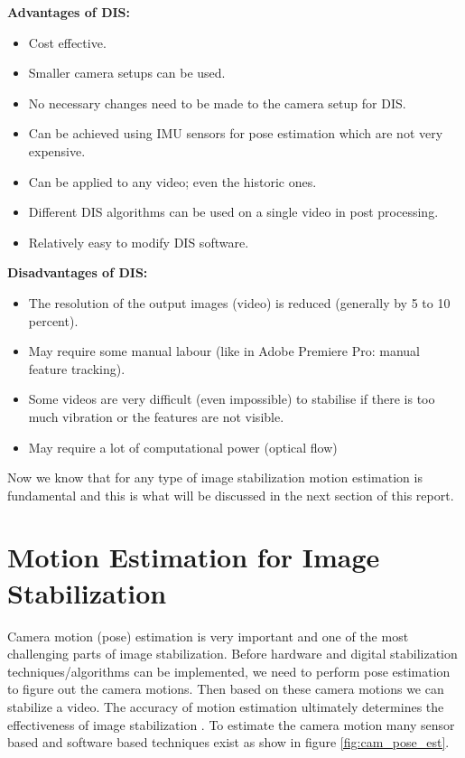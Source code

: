 \textbf{Advantages of DIS: }
\begin{itemize}
\item Cost effective.
\item Smaller camera setups can be used.
\item No necessary changes need to be made to the camera setup for DIS.
\item Can be achieved using IMU sensors for pose estimation which are not very expensive.
\item Can be applied to any video; even the historic ones.
\item Different DIS algorithms can be used on a single video in post processing.
\item Relatively easy to modify DIS software.
\end{itemize}

\textbf{Disadvantages of DIS:}
\begin{itemize}
\item The resolution of the output images (video) is reduced (generally by 5 to 10 percent).
\item May require some manual labour (like in Adobe Premiere Pro: manual feature tracking).
\item Some videos are very difficult (even impossible) to stabilise if there is too much vibration or the features are not visible.
\item May require a lot of computational power (optical flow)
\end{itemize}

Now we know that for any type of image stabilization motion estimation is fundamental and this is what will be discussed in the next section of this report.

\section{Motion Estimation for Image Stabilization}
\label{sec:pose_estimation}
Camera motion (pose) estimation is very important and one of the most challenging parts of image stabilization. Before hardware and digital stabilization techniques/algorithms can be implemented, we need to perform pose estimation to figure out the camera motions. Then based on these camera motions we can stabilize a video. The accuracy of motion estimation ultimately determines the effectiveness of image stabilization \citep{ryu2012robust}. To estimate the camera motion many sensor based and software based techniques exist as show in figure \ref{fig:cam_pose_est}.

